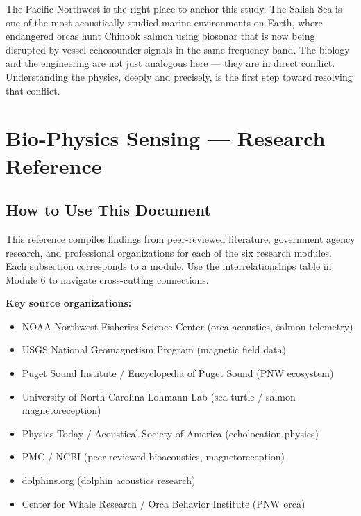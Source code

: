 \documentclass[11pt,letterpaper]{article}
\newcommand{\stageheader}[2]{%
  \noindent\colorbox{#2}{\makebox[\textwidth][l]{%
    \textcolor{white}{\bfseries\sffamily\hspace{6pt}#1\hspace{6pt}}}}%
  \vspace{0.5em}\par%
}
\begin{document}
The Pacific Northwest is the right place to anchor this study. The Salish Sea is one of the most acoustically studied marine environments on Earth, where endangered orcas hunt Chinook salmon using biosonar that is now being disrupted by vessel echosounder signals in the same frequency band. The biology and the engineering are not just analogous here --- they are in direct conflict. Understanding the physics, deeply and precisely, is the first step toward resolving that conflict.

\newpage
\stageheader{STAGE 2 --- RESEARCH REFERENCE}{secondary}

\section{Bio-Physics Sensing --- Research Reference}

\subsection{How to Use This Document}

This reference compiles findings from peer-reviewed literature, government agency research, and professional organizations for each of the six research modules. Each subsection corresponds to a module. Use the interrelationships table in Module 6 to navigate cross-cutting connections.

\textbf{Key source organizations:}
\begin{itemize}[noitemsep]
  \item NOAA Northwest Fisheries Science Center (orca acoustics, salmon telemetry)
  \item USGS National Geomagnetism Program (magnetic field data)
  \item Puget Sound Institute / Encyclopedia of Puget Sound (PNW ecosystem)
  \item University of North Carolina Lohmann Lab (sea turtle / salmon magnetoreception)
  \item Physics Today / Acoustical Society of America (echolocation physics)
  \item PMC / NCBI (peer-reviewed bioacoustics, magnetoreception)
  \item dolphins.org (dolphin acoustics research)
  \item Center for Whale Research / Orca Behavior Institute (PNW orca)
\end{itemize}
\end{document}
